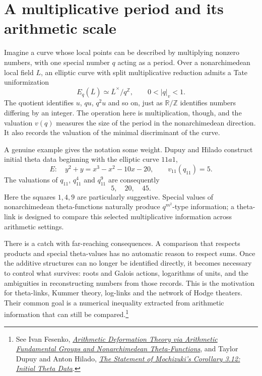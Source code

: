 
\section{A multiplicative period and its arithmetic scale}

Imagine a curve whose local points can be described by multiplying nonzero numbers, with one special number $q$ acting as a period. Over a nonarchimedean local field $L$, an elliptic curve with split multiplicative reduction admits a Tate uniformization
\[
 E_q(\overline L)\simeq\overline L^\times/q^{\mathbb Z},
 \qquad 0<|q|_v<1.
\]
The quotient identifies $u$, $qu$, $q^2u$ and so on, just as $\mathbb R/\mathbb Z$ identifies numbers differing by an integer. The operation here is multiplication, though, and the valuation $v(q)$ measures the size of the period in the nonarchimedean direction. It also records the valuation of the minimal discriminant of the curve.

A genuine example gives the notation some weight. Dupuy and Hilado construct initial theta data beginning with the elliptic curve $11a1$,
\[
 E:\quad y^2+y=x^3-x^2-10x-20,
 \qquad v_{11}(q_{11})=5.
\]
The valuations of $q_{11}$, $q_{11}^{4}$ and $q_{11}^{9}$ are consequently
\[
 \boxed{5,\quad20,\quad45.}
\]
Here the squares $1,4,9$ are particularly suggestive. Special values of nonarchimedean theta-functions naturally produce $q^{m^2}$-type information; a theta-link is designed to compare this selected multiplicative information across arithmetic settings.

There is a catch with far-reaching consequences. A comparison that respects products and special theta-values has no automatic reason to respect sums. Once the additive structures can no longer be identified directly, it becomes necessary to control what survives: roots and Galois actions, logarithms of units, and the ambiguities in reconstructing numbers from those records. This is the motivation for theta-links, Kummer theory, log-links and the network of Hodge theaters. Their common goal is a numerical inequality extracted from arithmetic information that can still be compared.\footnote{See Ivan Fesenko, \href{https://ivanfesenko.org/wp-content/uploads/2021/10/notesoniut.pdf}{\emph{Arithmetic Deformation Theory via Arithmetic Fundamental Groups and Nonarchimedean Theta-Functions}}, and Taylor Dupuy and Anton Hilado, \href{https://arxiv.org/abs/2004.13228}{\emph{The Statement of Mochizuki's Corollary 3.12: Initial Theta Data}}.}

